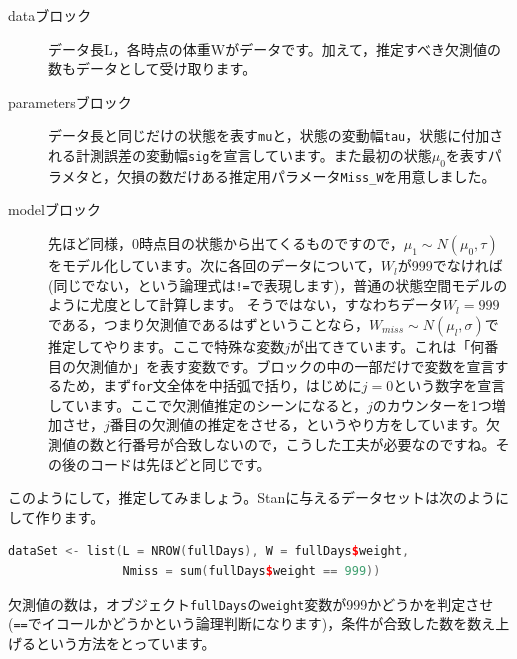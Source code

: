 \documentclass{ltjsbook}
\begin{document}
\begin{description}
	\item[dataブロック] データ長L，各時点の体重Wがデータです。加えて，推定すべき欠測値の数もデータとして受け取ります。
	\item[parametersブロック] データ長と同じだけの状態を表す\verb|mu|と，状態の変動幅\verb|tau|，状態に付加される計測誤差の変動幅\verb|sig|を宣言しています。また最初の状態$\mu_0$を表すパラメタと，欠損の数だけある推定用パラメータ\verb|Miss_W|を用意しました。
	\item[modelブロック] 先ほど同様，0時点目の状態から出てくるものですので，$\mu_1 \sim N(\mu_0,\tau)$をモデル化しています。次に各回のデータについて，$W_l$が999でなければ(同じでない，という論理式は\verb|!=|で表現します)，普通の状態空間モデルのように尤度として計算します。 そうではない，すなわちデータ$W_l=999$である，つまり欠測値であるはずということなら，$W_{miss} \sim N(\mu_l,\sigma)$で推定してやります。ここで特殊な変数$j$が出てきています。これは「何番目の欠測値か」を表す変数です。ブロックの中の一部だけで変数を宣言するため，まず\verb|for|文全体を中括弧で括り，はじめに$j=0$という数字を宣言しています。ここで欠測値推定のシーンになると，$j$のカウンターを1つ増加させ，$j$番目の欠測値の推定をさせる，というやり方をしています。欠測値の数と行番号が合致しないので，こうした工夫が必要なのですね。その後のコードは先ほどと同じです。
\end{description}

このようにして，推定してみましょう。Stanに与えるデータセットは次のようにして作ります。
\begin{lstlisting}[language=c++,label={code:16_06},caption={Stanに与えるデータセット}]
dataSet <- list(L = NROW(fullDays), W = fullDays$weight, 
                Nmiss = sum(fullDays$weight == 999))
\end{lstlisting}
欠測値の数は，オブジェクト\verb|fullDays|の\verb|weight|変数が999かどうかを判定させ(\verb|==|でイコールかどうかという論理判断になります)，条件が合致した数を数え上げるという方法をとっています。
\end{document}
